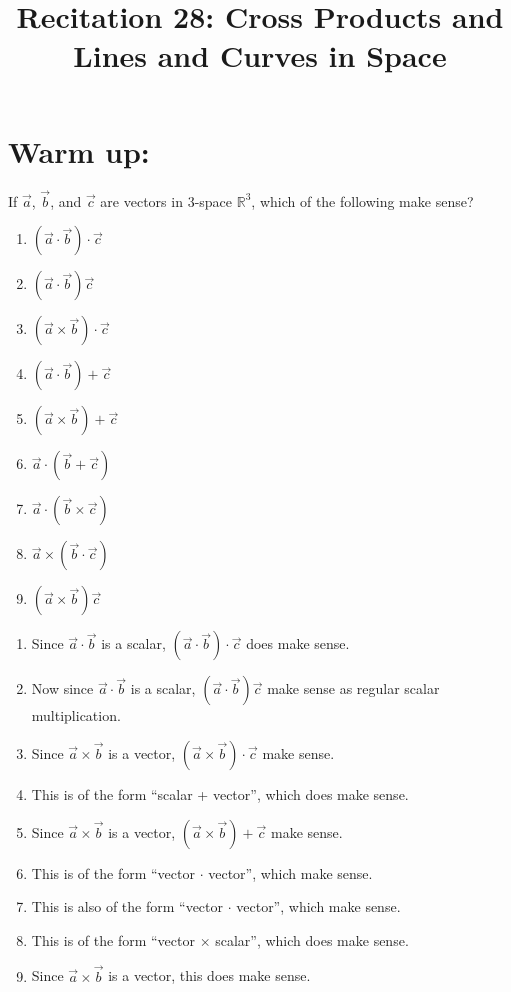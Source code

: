 \documentclass[handout]{ximera}
\title{Recitation 28: Cross Products and Lines and Curves in Space}
\begin{document}
\begin{abstract}		\end{abstract}
\maketitle



\section{Warm up:}



If $\vec{a}$, $\vec{b}$, and $\vec{c}$ are vectors in $3$-space $\mathbb{R}^3$, which of the following make sense?
	\begin{multicols}{3}
	\begin{enumerate}
	\item  $(\vec{a} \cdot \vec{b}) \cdot \vec{c}$
	\item  $(\vec{a} \cdot \vec{b})\vec{c}$
	\item  $(\vec{a} \times \vec{b}) \cdot \vec{c}$
	\item  $(\vec{a} \cdot \vec{b}) + \vec{c}$
	\item  $(\vec{a} \times \vec{b}) + \vec{c}$
	\item  $\vec{a} \cdot (\vec{b} + \vec{c})$
	\item  $\vec{a} \cdot (\vec{b} \times \vec{c})$
	\item  $\vec{a} \times (\vec{b} \cdot \vec{c})$
	\item  $(\vec{a} \times \vec{b}) \vec{c}$
	\end{enumerate}
	\end{multicols}
	
	\begin{freeResponse}
	\begin{enumerate}
	\item  Since $\vec{a} \cdot \vec{b}$ is a scalar, $(\vec{a} \cdot \vec{b}) \cdot \vec{c}$ does  make sense.
	\item  Now since $\vec{a} \cdot \vec{b}$ is a scalar, $(\vec{a} \cdot \vec{b})\vec{c}$  make sense as regular scalar multiplication.
	\item  Since $\vec{a} \times \vec{b}$ is a vector, $(\vec{a} \times \vec{b}) \cdot \vec{c}$  make sense.
	\item  This is of the form ``scalar + vector'', which does  make sense.
	\item  Since $\vec{a} \times \vec{b}$ is a vector, $(\vec{a} \times \vec{b}) + \vec{c}$  make sense.
	\item  This is of the form ``vector $\cdot$ vector'', which  make sense.
	\item  This is also of the form ``vector $\cdot$ vector'', which  make sense.
	\item  This is of the form ``vector $\times$ scalar'', which does  make sense.
	\item  Since $\vec{a} \times \vec{b}$ is a vector, this does  make sense.
	\end{enumerate}
	\end{freeResponse}
	
\end{document}

